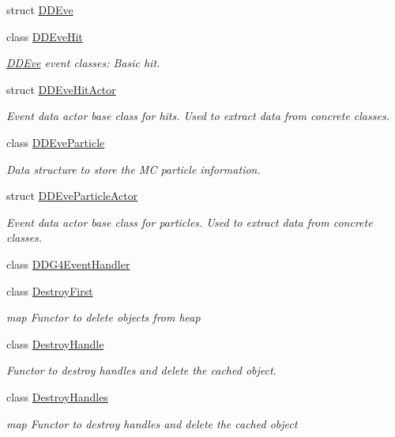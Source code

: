 \begin{DoxyCompactItemize}
struct \hyperlink{struct_d_d4hep_1_1_d_d_eve}{D\+D\+Eve}
\item 
class \hyperlink{class_d_d4hep_1_1_d_d_eve_hit}{D\+D\+Eve\+Hit}
\begin{DoxyCompactList}\small\item\em \hyperlink{struct_d_d4hep_1_1_d_d_eve}{D\+D\+Eve} event classes\+: Basic hit. \end{DoxyCompactList}\item 
struct \hyperlink{struct_d_d4hep_1_1_d_d_eve_hit_actor}{D\+D\+Eve\+Hit\+Actor}
\begin{DoxyCompactList}\small\item\em Event data actor base class for hits. Used to extract data from concrete classes. \end{DoxyCompactList}\item 
class \hyperlink{class_d_d4hep_1_1_d_d_eve_particle}{D\+D\+Eve\+Particle}
\begin{DoxyCompactList}\small\item\em Data structure to store the MC particle information. \end{DoxyCompactList}\item 
struct \hyperlink{struct_d_d4hep_1_1_d_d_eve_particle_actor}{D\+D\+Eve\+Particle\+Actor}
\begin{DoxyCompactList}\small\item\em Event data actor base class for particles. Used to extract data from concrete classes. \end{DoxyCompactList}\item 
class \hyperlink{class_d_d4hep_1_1_d_d_g4_event_handler}{D\+D\+G4\+Event\+Handler}
\item 
class \hyperlink{class_d_d4hep_1_1_destroy_first}{Destroy\+First}
\begin{DoxyCompactList}\small\item\em map Functor to delete objects from heap \end{DoxyCompactList}\item 
class \hyperlink{class_d_d4hep_1_1_destroy_handle}{Destroy\+Handle}
\begin{DoxyCompactList}\small\item\em Functor to destroy handles and delete the cached object. \end{DoxyCompactList}\item 
class \hyperlink{class_d_d4hep_1_1_destroy_handles}{Destroy\+Handles}
\begin{DoxyCompactList}\small\item\em map Functor to destroy handles and delete the cached object \end{DoxyCompactList}\item 

\end{DoxyCompactItemize}
